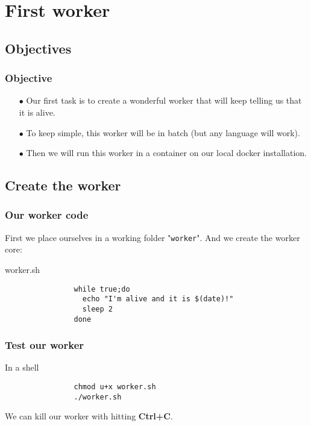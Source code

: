 \section{First worker}

\subsection{Objectives}	
	\begin{frame}
		\frametitle{Objective}
		
		\begin{itemize}
			\item[$\bullet$] Our first task is to create a wonderful worker that will keep telling us that it is alive.
			\item[$\bullet$] To keep simple, this worker will be in batch (but any language will work).	
			\item[$\bullet$] Then we will run this worker in a container on our local docker installation.
		\end{itemize}
		
	\end{frame}

\subsection{Create the worker}
	
	\begin{frame}[fragile]
		\frametitle{Our worker code}

		First we place ourselves in a working folder "\verb!worker!". And we create the worker core:
		
		\begin{block}{worker.sh}
			\begin{verbatim}
				while true;do
				  echo "I'm alive and it is $(date)!"
				  sleep 2
				done
			\end{verbatim}
		\end{block}
		
	\end{frame}

	\begin{frame}[fragile]
		\frametitle{Test our worker}
		
		\begin{block}{In a shell}
			\begin{verbatim}
				chmod u+x worker.sh
				./worker.sh
			\end{verbatim}
		\end{block}
		We can kill our worker with hitting \textbf{Ctrl+C}.
		
	\end{frame}
	
